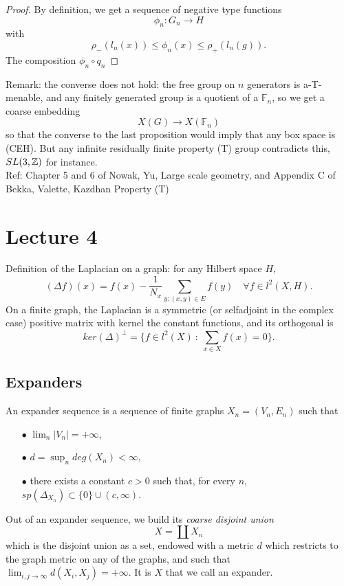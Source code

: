 \begin{proof}
By definition, we get a sequence of negative type functions 
\[\phi_n : G_n \rightarrow H\]
with 
\[\rho_-(l_n(x)) \leq \phi_n(x) \leq \rho_+(l_n(g)).\]
The composition $\phi_n\circ q_n$
\end{proof}

Remark: the converse does not hold: the free group on $n$ generators is a-T-menable, and any finitely generated group is a quotient of a $\mathbb F_n$, so we get a coarse embedding
\[X(G) \rightarrow X(\mathbb F_n)\]
so that the converse to the last proposition would imply that any box space is (CEH). But any infinite residually finite property (T) group contradicts this, $SL(3,\mathbb Z)$ for instance.\\

Ref: Chapter 5 and 6 of Nowak, Yu, Large scale geometry, and Appendix C of Bekka, Valette, Kazdhan Property (T)

\section{Lecture 4}

Definition of the Laplacian on a graph: for any Hilbert space $H$,
\[(\Delta f)(x) = f(x) - \frac{1}{N_x}\sum_{y : (x,y)\in E} f(y)\quad \forall f\in l^2(X,H).\]
On a finite graph, the Laplacian is a symmetric (or selfadjoint in the complex case) positive matrix with kernel the constant functions, and its orthogonal is 
\[ker(\Delta)^\perp = \{ f\in l^2(X) \ : \ \sum_{x\in X} f(x) = 0\}.\]

\subsection{Expanders}

\begin{definition}
An expander sequence is a sequence of finite graphs $X_n= (V_n, E_n)$ such that 
\begin{itemize}
\item[$\bullet$] $\lim_n |V_n| = +\infty $,
\item[$\bullet$] $d=\sup_n deg(X_n)< \infty$,
\item[$\bullet$] there exists a constant $c>0$ such that, for every $n$, $sp(\Delta_{X_n}) \subset \{0\} \cup (c,\infty)$.
\end{itemize}
\end{definition} 

Out of an expander sequence, we build its \textit{coarse disjoint union}
\[X = \coprod X_n\]
which is the disjoint union as a set, endowed with a metric $d$ which restricts to the graph metric on any of the graphs, and such that $\lim_{i,j\rightarrow \infty} d(X_i,X_j)=+\infty$. It is $X$ that we call an expander.\\

